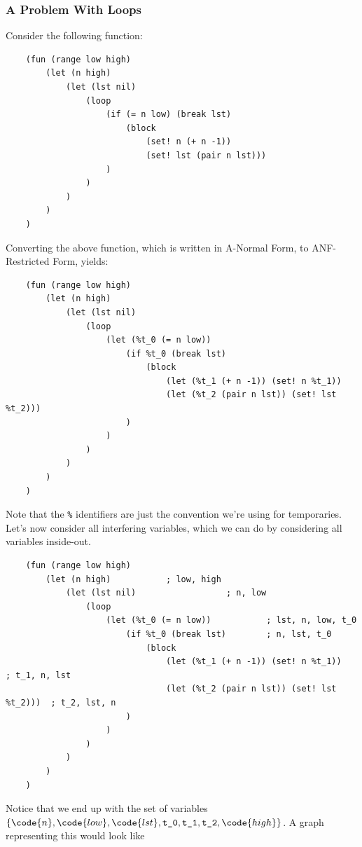 \documentclass[letterpaper]{article}
\begin{document}
\subsubsection{A Problem With Loops}
Consider the following function:
\begin{verbatim}
    (fun (range low high)
        (let (n high)
            (let (lst nil)
                (loop
                    (if (= n low) (break lst)
                        (block
                            (set! n (+ n -1))
                            (set! lst (pair n lst)))
                    )
                )
            )
        )
    )
\end{verbatim}
Converting the above function, which is written in A-Normal Form, to ANF-Restricted Form, yields:
\begin{verbatim}
    (fun (range low high)
        (let (n high)
            (let (lst nil)
                (loop
                    (let (%t_0 (= n low))
                        (if %t_0 (break lst)
                            (block
                                (let (%t_1 (+ n -1)) (set! n %t_1))
                                (let (%t_2 (pair n lst)) (set! lst %t_2)))
                        )
                    )
                )
            )
        )
    )\end{verbatim}
Note that the \verb|%| identifiers are just the convention we're using for temporaries. Let's now consider all interfering variables, which we can do by considering all variables inside-out. 
\begin{verbatim}
    (fun (range low high)
        (let (n high)           ; low, high
            (let (lst nil)                  ; n, low
                (loop
                    (let (%t_0 (= n low))           ; lst, n, low, t_0
                        (if %t_0 (break lst)        ; n, lst, t_0
                            (block
                                (let (%t_1 (+ n -1)) (set! n %t_1))         ; t_1, n, lst
                                (let (%t_2 (pair n lst)) (set! lst %t_2)))  ; t_2, lst, n
                        )
                    )
                )
            )
        )
    )\end{verbatim}
Notice that we end up with the set of variables $\{\code{n}, \code{low}, \code{lst}, \verb|t_0|, \verb|t_1|, \verb|t_2|, \code{high}\}$. A graph representing this would look like 
\end{document}
